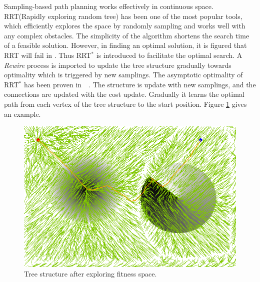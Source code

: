 \documentclass[conference]{IEEEtran}
\theoremstyle{definition}
\begin{document}
Sampling-based path planning works effectively in continuous space.
RRT(Rapidly exploring random tree) has been one of the most popular tools, which  efficiently explores the space by randomly sampling and works well with any complex obstacles.
The simplicity of the algorithm shortens the search time of a feasible solution.
However, in finding an optimal solution, it is figured that RRT will fail in \cite{Karaman.Frazzoli:RSS10}.
Thus RRT$^{*}$ is introduced to facilitate the optimal search.
A \emph{Rewire} process is imported to update the tree structure gradually towards optimality which is triggered by new samplings.
The asymptotic optimality of RRT$^{*}$ has been proven in~\cite{Karaman.Frazzoli:RSS10}~\cite{Karaman:2011:SAO:2000201.2000209}.
The structure is update with new samplings, and the connections are updated with the cost update.
Gradually it learns the optimal path from each vertex of the tree structure to the start position.
Figure \ref{fig:RRTstar2} gives an example.
\begin{figure}
\centering
\includegraphics[width=0.7\linewidth]{fig/RRTstar2}
\caption{Tree structure after exploring fitness space.}
\label{fig:RRTstar2}
\end{figure}
\end{document}

